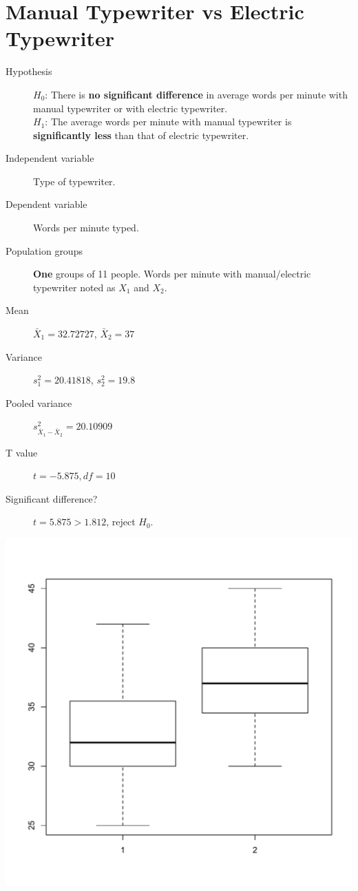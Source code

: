 \documentclass[a4paper,10pt,twocolumn]{article}
\begin{document}
\section{Manual Typewriter vs Electric Typewriter} %
\label{sec:typewriter}
\begin{description}
	\item[Hypothesis] 
		$H_0$: There is \textbf{no significant difference} in average words per minute with manual typewriter or with electric typewriter.\\
		$H_1$: The average words per minute with manual typewriter is \textbf{significantly less} than that of electric typewriter.
	\item[Independent variable] Type of typewriter.
	\item[Dependent variable] Words per minute typed.
	\item[Population groups] \textbf{One} groups of 11 people. Words per minute with manual/electric typewriter noted as $X_1$ and $X_2$.
	\item[Mean] $\bar{X}_1=32.72727$, $\bar{X}_2=37$
	\item[Variance] $s_1^2=20.41818$, $s_2^2=19.8$
	\item[Pooled variance] $s_{\bar{X}_1-\bar{X}_2}^2=20.10909$
	\item[T value] $t = -5.875, df = 10$
	\item[Significant difference?] $t = 5.875 > 1.812$, reject $H_0$.
\end{description}
\includegraphics[width=.5\textwidth]{typewriter.pdf}
\end{document}
